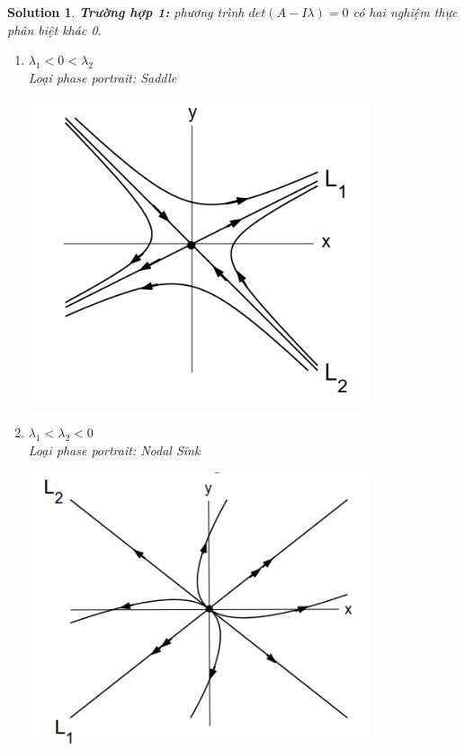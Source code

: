 \documentclass[a4paper]{article}
\newtheorem*{sol}{Solution}
\begin{document}
\begin{sol}
\textbf{Trường hợp 1:} phương trình $det(A - I\lambda) = 0$ có hai nghiệm thực phân biệt khác 0.
\begin{enumerate} 
    \item $\lambda_1<0< \lambda _2$\\
    Loại phase portrait: Saddle\\
    \begin{center}
        \includegraphics[width=100mm]{image/BT1/saddle.png}
    \end{center}
    
    
    \item $\lambda_1< \lambda _2<0$\\
    Loại phase portrait: Nodal Sink\\
   \begin{center}
        \includegraphics[width=100mm]{image/BT1/Nodal Sink.png}
   \end{center}
   

\end{enumerate}
\end{sol}
\end{document}
